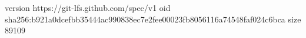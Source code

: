 version https://git-lfs.github.com/spec/v1
oid sha256:b921a0dcefbb35444ac990838ec7e2fee00023fb8056116a74548faf024c6bca
size 89109
